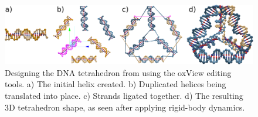 \begin{figure}
\includegraphics[width=\textwidth]{figures/tetra.eps} 
\caption{Designing the DNA tetrahedron from \cite{goodman2005rapid} using the oxView editing tools. a) The initial helix created. b) Duplicated helices being translated into place. c) Strands ligated together. d) The resulting 3D tetrahedron shape, as seen after applying rigid-body dynamics.}
\label{fig:design}
\end{figure}


\newcommand{\toolHeight}{1.5em}


